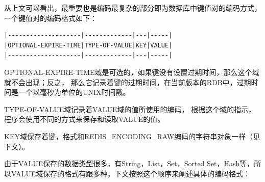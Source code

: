 \documentclass{zjutthesis}
\begin{document}
从上文可以看出，最重要也是编码最复杂的部分即为数据库中键值对的编码方式，一个键值对的编码格式如下：
\begin{verbatim}
|--------------------|-------------|---|-----|
|OPTIONAL-EXPIRE-TIME|TYPE-OF-VALUE|KEY|VALUE|
|--------------------|-------------|---|-----|
\end{verbatim}
OPTIONAL-EXPIRE-TIME域是可选的，如果键没有设置过期时间，那么这个域就不会出现；反之，
那么它记录着键的过期时间，在当前版本的RDB中，过期时间是一个以毫秒为单位的UNIX时间戳。

TYPE-OF-VALUE域记录着VALUE域的值所使用的编码，
根据这个域的指示，程序会使用不同的方式来保存和读取VALUE的值。

KEY域保存着键，格式和REDIS\_ENCODING\_RAW编码的字符串对象一样（见下文）。

由于VALUE保存的数据类型很多，有String，List，Set，Sorted Set，Hash等，所以VALUE域保存的格式有跟多种，下文按照这个顺序来阐述具体的编码格式：
\end{document}
